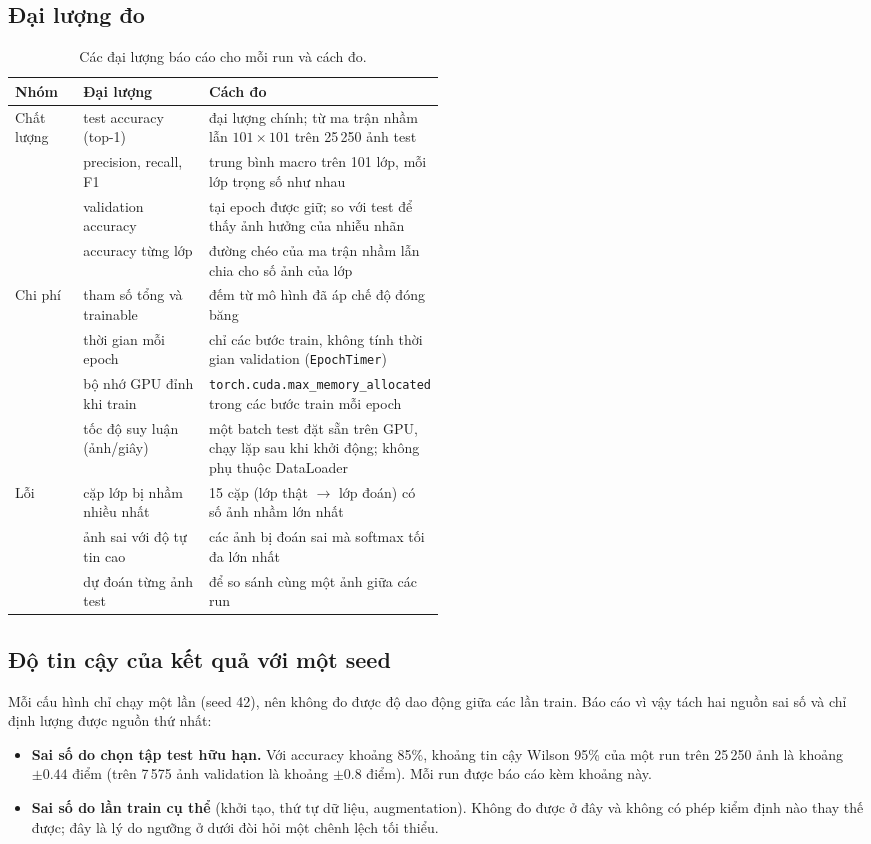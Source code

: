 \subsection{Đại lượng đo}
\begin{table}[htbp]
\centering
\caption{Các đại lượng báo cáo cho mỗi run và cách đo.}
\label{tab:a1-metrics}
\small
\begin{adjustbox}{max width=\linewidth}
\begin{tabular}{llp{0.5\linewidth}}
\toprule
Nhóm & Đại lượng & Cách đo \\
\midrule
Chất lượng & test accuracy (top-1) & đại lượng chính; từ ma trận nhầm lẫn \(101\times101\) trên 25\,250 ảnh test \\
 & precision, recall, F1 & trung bình macro trên 101 lớp, mỗi lớp trọng số như nhau \\
 & validation accuracy & tại epoch được giữ; so với test để thấy ảnh hưởng của nhiễu nhãn \\
 & accuracy từng lớp & đường chéo của ma trận nhầm lẫn chia cho số ảnh của lớp \\
\midrule
Chi phí & tham số tổng và trainable & đếm từ mô hình đã áp chế độ đóng băng \\
 & thời gian mỗi epoch & chỉ các bước train, không tính thời gian validation (\texttt{EpochTimer}) \\
 & bộ nhớ GPU đỉnh khi train & \texttt{torch.cuda.max\_memory\_allocated} trong các bước train mỗi epoch \\
 & tốc độ suy luận (ảnh/giây) & một batch test đặt sẵn trên GPU, chạy lặp sau khi khởi động; không phụ thuộc DataLoader \\
\midrule
Lỗi & cặp lớp bị nhầm nhiều nhất & 15 cặp (lớp thật \(\to\) lớp đoán) có số ảnh nhầm lớn nhất \\
 & ảnh sai với độ tự tin cao & các ảnh bị đoán sai mà softmax tối đa lớn nhất \\
 & dự đoán từng ảnh test & để so sánh cùng một ảnh giữa các run \\
\bottomrule
\end{tabular}
\end{adjustbox}
\end{table}

\subsection{Độ tin cậy của kết quả với một seed}
Mỗi cấu hình chỉ chạy một lần (seed 42), nên không đo được độ dao động giữa các lần train. Báo cáo vì vậy tách hai nguồn sai số và chỉ định lượng được nguồn thứ nhất:
\begin{itemize}
\item \textbf{Sai số do chọn tập test hữu hạn.} Với accuracy khoảng 85\%, khoảng tin cậy Wilson 95\% của một run trên 25\,250 ảnh là khoảng \(\pm0.44\) điểm (trên 7\,575 ảnh validation là khoảng \(\pm0.8\) điểm). Mỗi run được báo cáo kèm khoảng này.
\item \textbf{Sai số do lần train cụ thể} (khởi tạo, thứ tự dữ liệu, augmentation). Không đo được ở đây và không có phép kiểm định nào thay thế được; đây là lý do ngưỡng ở dưới đòi hỏi một chênh lệch tối thiểu.
\end{itemize}

